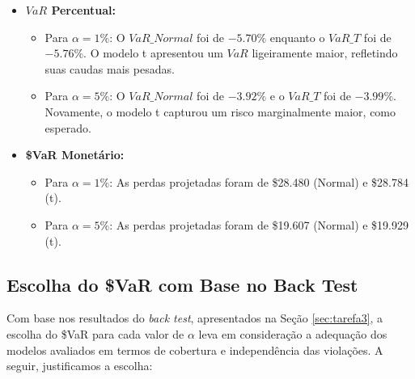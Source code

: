 \documentclass[a4paper, 12pt]{article}
\begin{document}
\begin{itemize}
    \item \textbf{\(VaR\) Percentual:}
    \begin{itemize}
        \item Para \(\alpha = 1\%\): O \(VaR\_Normal\) foi de \(-5.70\%\) enquanto o \(VaR\_T\) foi de \(-5.76\%\). O modelo t apresentou um \(VaR\) ligeiramente maior, refletindo suas caudas mais pesadas.
        \item Para \(\alpha = 5\%\): O \(VaR\_Normal\) foi de \(-3.92\%\) e o \(VaR\_T\) foi de \(-3.99\%\). Novamente, o modelo t capturou um risco marginalmente maior, como esperado.
    \end{itemize}
    \item \textbf{\$VaR Monetário:}
    \begin{itemize}
        \item Para \(\alpha = 1\%\): As perdas projetadas foram de \$28.480 (Normal) e \$28.784 (t).
        \item Para \(\alpha = 5\%\): As perdas projetadas foram de \$19.607 (Normal) e \$19.929 (t).
    \end{itemize}
\end{itemize}

\subsection{Escolha do \$VaR com Base no Back Test}

Com base nos resultados do \emph{back test}, apresentados na Seção \ref{sec:tarefa3}, a escolha do \$VaR para cada valor de \(\alpha\) leva em consideração a adequação dos modelos avaliados em termos de cobertura e independência das violações. A seguir, justificamos a escolha:
\end{document}
